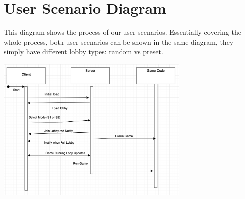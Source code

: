 \documentclass[12pt]{report}
\begin{document}



\section{User Scenario Diagram}
This diagram shows the process of our user scenarios. Essentially covering the whole process, both user scenarios can be shown in the same diagram, they simply have different lobby types: random vs preset.

\includegraphics[width=\linewidth,height=7cm]{images/game_process.png}
\end{document}
